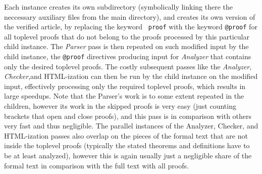 \documentclass{llncs}
\begin{document}
Each instance creates its own subdirectory (symbolically linking there
the neccessary auxiliary files from the main directory), and creates
its own version of the verified article, by replacing the keyword {\tt
  proof} with the keyword {\tt @proof} for all toplevel proofs that do
not belong to the proofs processed by this particular child
instance. The \emph{Parser} pass is then repeated on such modified
input by the child instance, the {\tt @proof} directives producing
input for \emph{Analyzer} that contains only the desired toplevel
proofs. The costly subsequent passes like the \emph{Analyzer},
\emph{Checker},and HTML-ization can then be run by the child instance
on the modified input, effectively processing only the required
toplevel proofs, which results in large speedups. Note that the
Parser's work is to some extent repeated in the children, however its
work in the skipped proofs is very easy (just counting brackets that
open and close proofs), and this pass is in comparison with others very
fast and thus negligible. The parallel instances of the Analyzer,
Checker, and HTML-ization passes also overlap on the pieces of the
formal text that are not inside the toplevel proofs (typically the
stated theorems and definitions have to be at least analyzed), however
this is again usually just a negligible share of the formal text in
comparison with the full text with all proofs. 
\end{document}
